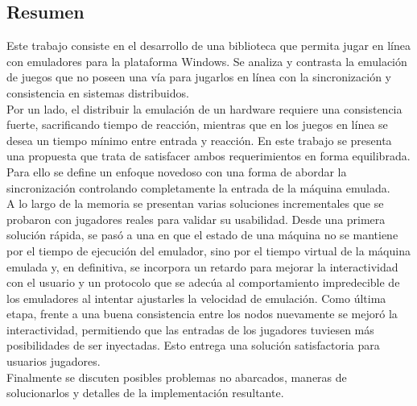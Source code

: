 \documentclass[12pt,spanish,letterpaper,color]{uchile}
\begin{document}
\begin{preface} 
\section{Resumen}
        Este trabajo consiste en el desarrollo de una biblioteca que permita jugar en línea con
emuladores para la plataforma Windows. Se analiza y contrasta la emulación de juegos que no
poseen una vía para jugarlos en línea con la sincronización y consistencia en sistemas
distribuidos.\\

Por un lado, el distribuir la emulación de un hardware requiere una consistencia fuerte,
sacrificando tiempo de reacción, mientras que en los juegos en línea se desea un tiempo mínimo
entre entrada y reacción. En este trabajo se presenta una propuesta que trata de satisfacer ambos
requerimientos en forma equilibrada. Para ello se define un enfoque novedoso con una forma de
abordar la sincronización controlando completamente la entrada de la máquina emulada.\\

A lo largo de la memoria se presentan varias soluciones incrementales que se probaron
con jugadores reales para validar su usabilidad. Desde una primera solución rápida, se pasó a una
en que el estado de una máquina no se mantiene por el tiempo de ejecución del emulador, sino
por el tiempo virtual de la máquina emulada y, en definitiva, se incorpora un retardo para mejorar
la interactividad con el usuario y un protocolo que se adecúa al comportamiento impredecible de
los emuladores al intentar ajustarles la velocidad de emulación. Como última etapa, frente a una
buena consistencia entre los nodos nuevamente se mejoró la interactividad, permitiendo que las
entradas de los jugadores tuviesen más posibilidades de ser inyectadas. Esto entrega una solución
satisfactoria para usuarios jugadores.\\

Finalmente se discuten posibles problemas no abarcados,
maneras de solucionarlos y
detalles de la implementación resultante.




\end{preface}
\end{document}
